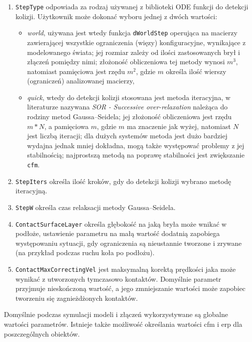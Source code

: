 \begin {enumerate}
	 \item \texttt{StepType} odpowiada za rodzaj używanej z biblioteki ODE funkcji do detekcji kolizji. Użytkownik może dokonać wyboru jednej z dwóch wartości:
	      \begin{itemize}
	       \item \textit{world}, używana jest wtedy funkcja \texttt{dWorldStep} operująca na macierzy zawierającej wszystkie ograniczenia (więzy) konfiguracyjne, wynikające z modelowanego świata;
	      jej rozmiar zależy od ilości zastosowanych brył i złączeń pomiędzy nimi; złożoność obliczeniowa tej metody wynosi $m^3$, natomiast pamięciowa
	      jest rzędu $m^2$, gdzie $m$ określa ilość wierszy (ograniczeń) analizowanej macierzy,
	       \item \textit{quick}, wtedy do detekcji kolizji stosowana jest metoda iteracyjna, w literaturze nazywana \textit{SOR - Successive over-relaxation} należąca do rodziny metod Gaussa–Seidela; jej złożoność obliczeniowa jest rzędu $m*N$,
		a pamięciowa $m$, gdzie $m$ ma znaczenie jak wyżej, natomiast $N$ jest liczbą iteracji;
		dla dużych systemów metoda jest dużo bardziej wydajna jednak mniej dokładna, mogą także występować problemy z jej stabilnością; najprostszą metodą na poprawę stabilności jest zwiększanie \texttt{cfm}. 
	      \end{itemize}
	 \item \texttt{StepIters} określa ilość kroków, gdy do detekcji kolizji wybrano metodę iteracyjną.
	 \item \texttt{StepW} określa czas relaksacji metody Gaussa–Seidela. 
	 \item \texttt{ContactSurfaceLayer} określa głębokość na jaką bryła może wnikać w podłoże, ustawienie parametru na małą wartość dodatnią zapobiega występowaniu sytuacji, gdy ograniczenia są nieustannie tworzone
	  i zrywane (na przykład podczas ruchu koła po podłożu).
	 \item \texttt{ContactMaxCorrectingVel} jest maksymalną korektą prędkości jaka może wynikać z utworzonych tymczasowo kontaktów. Domyślnie parametr przyjmuje nieskończoną wartość, a jego zmniejszanie
	   wartości może zapobiec tworzeniu się zagnieżdżonych kontaktów. 
	\end {enumerate}
	
	Domyślnie  podczas symulacji modeli i złączeń wykorzystywane są  globalne wartości parametrów. Istnieje także możliwość określania wartości cfm i erp
	dla poszczególnych obiektów.\newline

